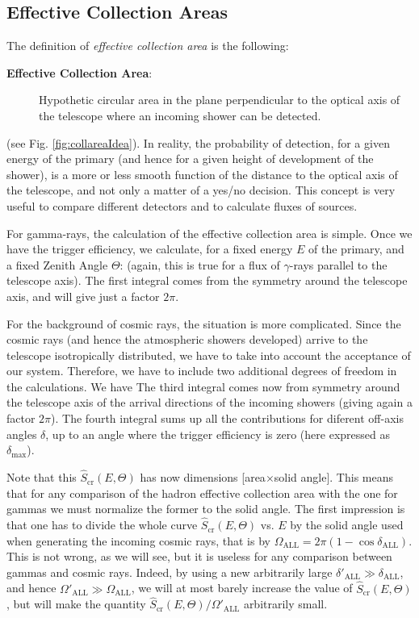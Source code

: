 \subsection{Effective Collection Areas}

The definition of \emph{effective collection area} is the following:
%
\begin{description}
\item[{\bfseries Effective Collection Area}:] Hypothetic circular area
  in the plane perpendicular to the optical axis of the telescope
  where an incoming shower can be detected.
\end{description}
%
(see Fig. \ref{fig:collareaIdea}). In reality, the probability of
detection, for a given energy of the primary (and hence for a given
height of development of the shower), is a more or less smooth
function of the distance to the optical axis of the telescope, and not
only a matter of a yes/no decision. This concept is very useful to
compare different detectors and to calculate fluxes of sources.

\collareaIdeafig

For gamma-rays, the calculation of the effective collection area is
simple. Once we have the trigger efficiency, we calculate, for a fixed
energy $E$ of the primary, and a fixed Zenith Angle $\Theta$:
%
\Sgammaeq
%
(again, this is true for a flux of $\gamma$-rays parallel to the
telescope axis). The first integral comes from the symmetry around the
telescope axis, and will give just a factor $2\pi$.

For the background of cosmic rays, the situation is more complicated.
Since the cosmic rays (and hence the atmospheric showers developed)
arrive to the telescope isotropically distributed, we have to take
into account the acceptance of our system. Therefore, we have to
include two additional degrees of freedom in the calculations. We have
%
\Screq
%
The third integral comes now from symmetry around the telescope axis
of the arrival directions of the incoming showers (giving again a
factor $2\pi$). The fourth integral sums up all the contributions for
diferent off-axis angles $\delta$, up to an angle where the trigger
efficiency is zero (here expressed as $\delta_{\mathrm{max}}$).

Note that this $\hat{S}_{\mathrm{cr}}(E,\Theta)$ has now dimensions
[area$\times$solid angle]. This means that for any comparison of the
hadron effective collection area with the one for gammas we must
normalize the former to the solid angle.  The first impression is that
one has to divide the whole curve $\hat{S}_{\mathrm{cr}}(E,\Theta)$
vs. $E$ by the solid angle used when generating the incoming cosmic
rays, that is by
$\Omega_{\mathrm{ALL}}=2\pi(1-\cos\delta_{\mathrm{ALL}})$. This is not
wrong, as we will see, but it is useless for any comparison between
gammas and cosmic rays.  Indeed, by using a new arbitrarily large
$\delta'_{\mathrm{ALL}} \gg \delta_{\mathrm{ALL}}$, and hence
$\Omega'_{\mathrm{ALL}} \gg \Omega_{\mathrm{ALL}}$, we will at most
barely increase the value of $\hat{S}_{\mathrm{cr}}(E,\Theta)$, but
will make the quantity
$\hat{S}_{\mathrm{cr}}(E,\Theta)/\Omega'_{\mathrm{ALL}}$ arbitrarily
small.

